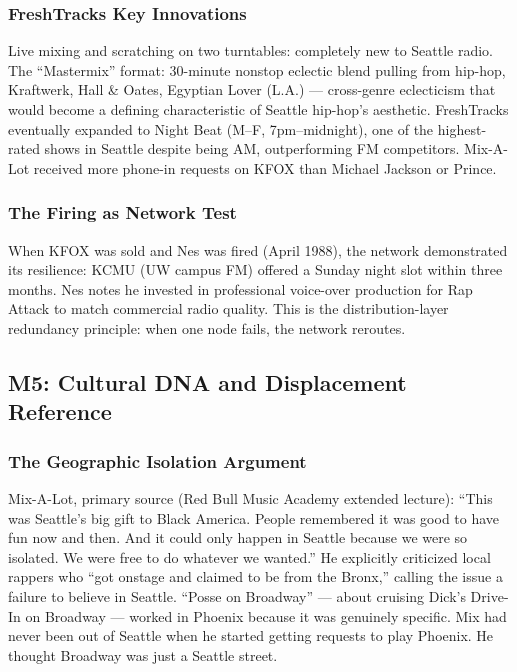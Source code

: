 \documentclass[11pt,letterpaper]{article}
\begin{document}
\subsubsection{FreshTracks Key Innovations}

Live mixing and scratching on two turntables: completely new to Seattle radio. The ``Mastermix'' format: 30-minute nonstop eclectic blend pulling from hip-hop, Kraftwerk, Hall \& Oates, Egyptian Lover (L.A.) --- cross-genre eclecticism that would become a defining characteristic of Seattle hip-hop's aesthetic. FreshTracks eventually expanded to Night Beat (M--F, 7pm--midnight), one of the highest-rated shows in Seattle despite being AM, outperforming FM competitors. Mix-A-Lot received more phone-in requests on KFOX than Michael Jackson or Prince.

\subsubsection{The Firing as Network Test}

When KFOX was sold and Nes was fired (April 1988), the network demonstrated its resilience: KCMU (UW campus FM) offered a Sunday night slot within three months. Nes notes he invested in professional voice-over production for Rap Attack to match commercial radio quality. This is the distribution-layer redundancy principle: when one node fails, the network reroutes.

\subsection{M5: Cultural DNA and Displacement Reference}

\subsubsection{The Geographic Isolation Argument}

Mix-A-Lot, primary source (Red Bull Music Academy extended lecture): ``This was Seattle's big gift to Black America. People remembered it was good to have fun now and then. And it could only happen in Seattle because we were so isolated. We were free to do whatever we wanted.'' He explicitly criticized local rappers who ``got onstage and claimed to be from the Bronx,'' calling the issue a failure to believe in Seattle. ``Posse on Broadway'' --- about cruising Dick's Drive-In on Broadway --- worked in Phoenix because it was genuinely specific. Mix had never been out of Seattle when he started getting requests to play Phoenix. He thought Broadway was just a Seattle street.
\end{document}
